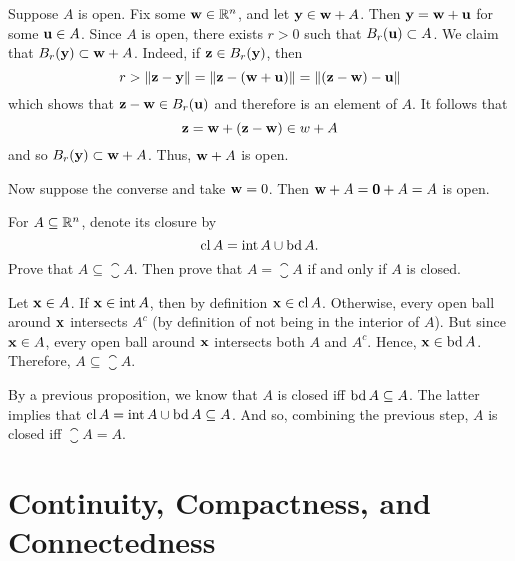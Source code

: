 \documentclass[letterpaper, twoside, 12pt]{book}
\begin{document}
\begin{solution}
    Suppose \(A\) is open. Fix some \(\mathbf w \in \mathbb R^n\),
    and let \(\mathbf y \in \mathbf w + A\). Then 
    \(\mathbf y = \mathbf w + \mathbf u\) for some \(\mathbf u \in A\). 
    Since \(A\) is open, there exists \(r > 0\) such that
    \(B_r(\mathbf u) \subset A\). We claim that 
    \(B_r(\mathbf y) \subset \mathbf w + A\). Indeed, if \(\mathbf z \in B_r(\mathbf y)\),
    then
    \[ r > \| \mathbf z - \mathbf y \| = \| \mathbf z - (\mathbf w + \mathbf u) \| 
    = \| (\mathbf z - \mathbf w) - \mathbf u \| \]
    which shows that \(\mathbf z - \mathbf w \in B_r(\mathbf u)\) and therefore
    is an element of \(A\). It follows that
    \[ \mathbf z = \mathbf w + (\mathbf z - \mathbf w) \in w + A \]
    and so \(B_r(\mathbf y) \subset \mathbf w + A\). Thus, \(\mathbf w + A\) is open.

    Now suppose the converse and take \(\mathbf w = 0\). Then
    \(\mathbf w + A = \mathbf 0 + A = A\) is open.
\end{solution}

\begin{exercise}[12]
  For \(A\subseteq\mathbb R^n\), denote its closure by
  \[
    \operatorname{cl} A = \operatorname{int} A \cup \operatorname{bd} A
  .\]
  Prove that \(A\subseteq \closure A\). Then prove that
  \(A=\closure A\) if and only if \(A\) is closed.
\end{exercise}

\begin{solution}
    Let \(\mathbf x \in A\). If \(\mathbf x \in \operatorname{int} A\),
    then by definition \(\mathbf x \in \operatorname{cl} A\). Otherwise,
    every open ball around \(\mathbf x\) intersects \(A^c\)
    (by definition of not being in the interior of \(A\)). But
    since \(\mathbf x \in A\), every open ball around \(\mathbf x\)
    intersects both \(A\) and \(A^c\). Hence, \(\mathbf x \in \operatorname{bd} A\).
    Therefore, \(A \subseteq \closure A\).

    By a previous proposition, we know that \(A\) is closed iff
    \(\operatorname{bd} A \subseteq A\). The latter implies that
    \(\operatorname{cl} A = \operatorname{int} A \cup \operatorname{bd} A \subseteq A\). 
    And so, combining the previous step, \(A\) is closed iff
    \(\closure A = A \).
\end{solution}





\chapter{Continuity, Compactness, and Connectedness}
\end{document}
